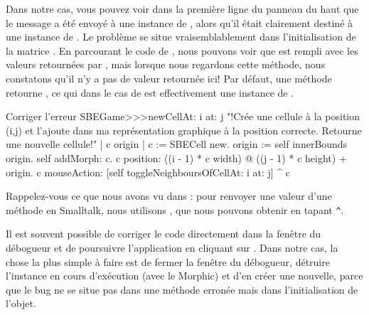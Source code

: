 \documentclass[a4paper,10pt,twoside]{book}
\begin{document}
Dans notre cas, vous pouvez voir dans la première ligne du panneau du haut que le message  a été envoyé à une instance de , alors qu'il était clairement destiné à une instance de .
Le problème se situe vraisemblablement dans l'initialisation de la matrice .
En parcourant le code de , nous pouvons
voir que  est rempli avec les valeurs retournées par
, mais lorsque nous regardons cette méthode, nous
constatons qu'il n'y a pas de valeur retournée ici!
Par défaut, une méthode retourne , ce qui dans le cas de  est effectivement une instance de .


\begin{method}{Corriger l'erreur}
SBEGame>>>newCellAt: i at: j
    "!Crée une cellule à la position (i,j) et l'ajoute dans ma
    représentation graphique à la position correcte. Retourne une nouvelle cellule!"
   | c origin |
   c := SBECell new.
   origin := self innerBounds origin.
   self addMorph: c.
   c position: ((i - 1) * c width) @ ((j - 1) * c height) + origin.
   c mouseAction: [self toggleNeighboursOfCellAt: i at: j]
   ^ c
\end{method}

\noindent
Rappelez-vous ce que nous avons vu dans :
pour renvoyer une valeur d'une méthode en Smalltalk, nous utilisons 
 \ct{^}, que nous pouvons obtenir en tapant \verb|^|.

Il est souvent possible de corriger le code directement dans la
fen\^etre du débogueur et de poursuivre l'application en cliquant sur
.
Dans notre cas, la chose la plus simple à faire est de fermer la
fen\^etre du débogueur, détruire l'instance en cours d'exécution (avec
le  Morphic) et d'en créer une nouvelle, parce que le bug
ne se situe pas dans une méthode erronée mais dans
l'initialisation de l'objet.
\end{document}
